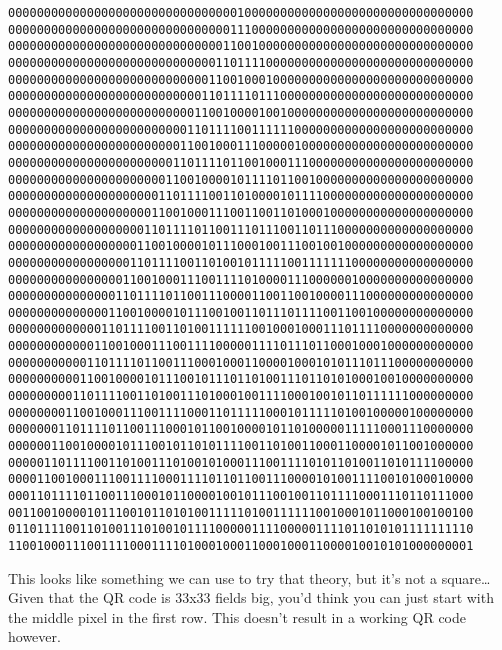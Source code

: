 \documentclass[11pt]{article}
\begin{document}
    \begin{Verbatim}[commandchars=\\\{\}]
00000000000000000000000000000000100000000000000000000000000000000
00000000000000000000000000000001110000000000000000000000000000000
00000000000000000000000000000011001000000000000000000000000000000
00000000000000000000000000000110111100000000000000000000000000000
00000000000000000000000000001100100010000000000000000000000000000
00000000000000000000000000011011110111000000000000000000000000000
00000000000000000000000000110010000100100000000000000000000000000
00000000000000000000000001101111001111110000000000000000000000000
00000000000000000000000011001000111000001000000000000000000000000
00000000000000000000000110111101100100011100000000000000000000000
00000000000000000000001100100001011110110010000000000000000000000
00000000000000000000011011110011010000101111000000000000000000000
00000000000000000000110010001110011001101000100000000000000000000
00000000000000000001101111011001110111001101110000000000000000000
00000000000000000011001000010111000100111001001000000000000000000
00000000000000000110111100110100101111100111111100000000000000000
00000000000000001100100011100111101000011100000010000000000000000
00000000000000011011110110011100001100110010000111000000000000000
00000000000000110010000101110010011011101111001100100000000000000
00000000000001101111001101001111110010001000111011110000000000000
00000000000011001000111001111000001111011101100010001000000000000
00000000000110111101100111000100011000010001010111011100000000000
00000000001100100001011100101110110100111011010100010010000000000
00000000011011110011010011101000100111100010010110111111000000000
00000000110010001110011110001101111100010111110100100000100000000
00000001101111011001110001011001000010110100000111110001110000000
00000011001000010111001011010111100110100110001100001011001000000
00000110111100110100111010010100011100111101011010011010111100000
00001100100011100111100011110110110011100001010011110010100010000
00011011110110011100010110000100101110010011011110001110110111000
00110010000101110010110101001111101001111110010001011000100100100
01101111001101001110100101111000001111000001111011010101111111110
11001000111001111000111101000100011000100011000010010101000000001
    \end{Verbatim}

    This looks like something we can use to try that theory, but it's not a
square\ldots{} Given that the QR code is 33x33 fields big, you'd think
you can just start with the middle pixel in the first row. This doesn't
result in a working QR code however.
\end{document}
